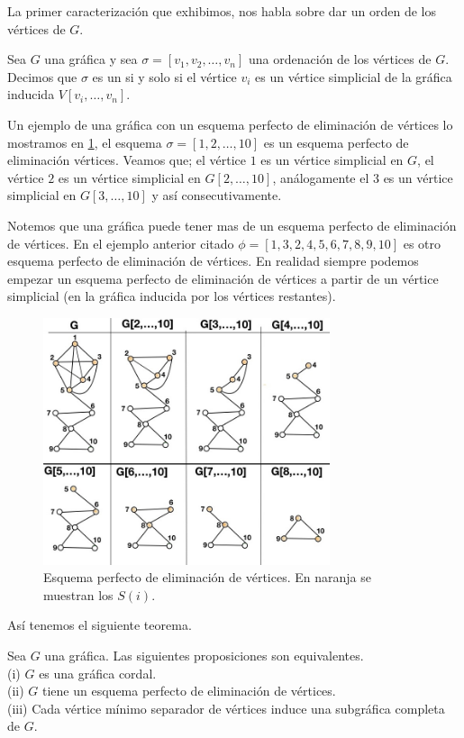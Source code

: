 La primer caracterización que exhibimos, nos habla sobre dar un orden de los
vértices de $G$.

Sea $G$ una gráfica y sea $\sigma= [v_1,v_2, \dots, v_n]$ una ordenación de los
vértices de $G$. Decimos que $\sigma$ es un  si y solo si el vértice $v_i$ es un vértice simplicial
de la gráfica inducida $V[v_{i}, \dots , v_n]$.

Un ejemplo de una gráfica con un esquema perfecto de eliminación de vértices lo
mostramos en \cref{fig:16}, el esquema $\sigma=[1,2,\dots, 10]$ es un esquema
perfecto de eliminación vértices. Veamos que; el vértice $1$ es un vértice
simplicial en $G$, el vértice $2$ es un vértice simplicial en $G[2, \dots, 10]$,
análogamente el $3$ es un vértice simplicial en $G[3, \dots, 10]$ y así
consecutivamente. 

Notemos que una gráfica puede tener mas de un esquema perfecto de eliminación de
vértices. En el ejemplo anterior citado $\phi = [1,3,2,4,5,6,7,8,9,10]$ es otro
esquema perfecto de eliminación de vértices. En realidad siempre podemos empezar
un esquema perfecto de eliminación de vértices a partir de un vértice simplicial
(en la gráfica inducida por los vértices restantes).

\begin{figure}[H]
  \centering
  \includegraphics[width=0.75\textwidth]{recursos/capturas/19.jpg}
  \caption{Esquema perfecto de eliminación de vértices. En naranja se muestran los $S(i)$.}
  \label{fig:16}
\end{figure}

Así tenemos el siguiente teorema. 

\begin{teorema}
\label{teo:102}
    Sea $G$ una gráfica. Las siguientes proposiciones son equivalentes.\\
    (i) $G$ es una gráfica cordal.\\
    (ii) $G$ tiene un esquema perfecto de eliminación de vértices.\\
    (iii) Cada vértice mínimo separador de vértices induce una subgráfica
    completa de $G$.
\end{teorema}

